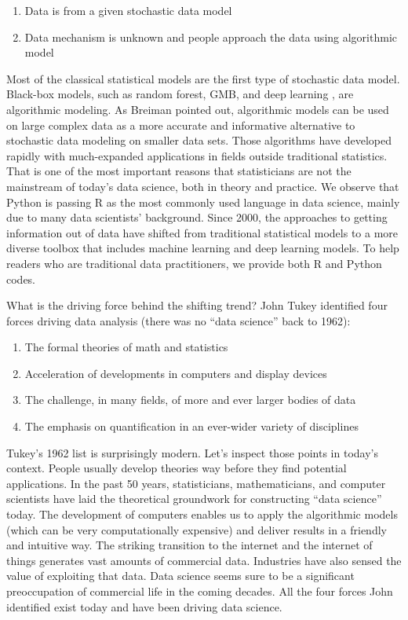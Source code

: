 \documentclass[12pt,]{krantz}
\providecommand{\tightlist}{%
  \setlength{\itemsep}{0pt}\setlength{\parskip}{0pt}}
\begin{document}
\begin{enumerate}
\def\labelenumi{(\arabic{enumi})}
\tightlist
\item
  Data is from a given stochastic data model\\
\item
  Data mechanism is unknown and people approach the data using algorithmic model
\end{enumerate}

Most of the classical statistical models are the first type of stochastic data model. Black-box models, such as random forest, GMB, and deep learning   , are algorithmic modeling. As Breiman pointed out, algorithmic models can be used on large complex data as a more accurate and informative alternative to stochastic data modeling on smaller data sets. Those algorithms have developed rapidly with much-expanded applications in fields outside traditional statistics. That is one of the most important reasons that statisticians are not the mainstream of today's data science, both in theory and practice. We observe that Python is passing R as the most commonly used language in data science, mainly due to many data scientists' background. Since 2000, the approaches to getting information out of data have shifted from traditional statistical models to a more diverse toolbox that includes machine learning and deep learning models. To help readers who are traditional data practitioners, we provide both R and Python codes.

What is the driving force behind the shifting trend? John Tukey identified four forces driving data analysis (there was no ``data science'' back to 1962):

\begin{enumerate}
\def\labelenumi{\arabic{enumi}.}
\tightlist
\item
  The formal theories of math and statistics
\item
  Acceleration of developments in computers and display devices
\item
  The challenge, in many fields, of more and ever larger bodies of data
\item
  The emphasis on quantification in an ever-wider variety of disciplines
\end{enumerate}

Tukey's 1962 list is surprisingly modern. Let's inspect those points in today's context. People usually develop theories way before they find potential applications. In the past 50 years, statisticians, mathematicians, and computer scientists have laid the theoretical groundwork for constructing ``data science'' today. The development of computers enables us to apply the algorithmic models (which can be very computationally expensive) and deliver results in a friendly and intuitive way. The striking transition to the internet and the internet of things generates vast amounts of commercial data. Industries have also sensed the value of exploiting that data. Data science seems sure to be a significant preoccupation of commercial life in the coming decades. All the four forces John identified exist today and have been driving data science.
\end{document}
